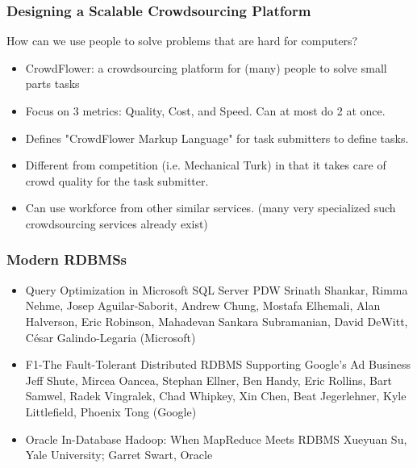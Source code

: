 \begin{frame} [plain]%
\frametitle{Designing a Scalable Crowdsourcing Platform}
	
How can we use people to solve problems that are hard for computers?

\begin{itemize}
\item CrowdFlower: a crowdsourcing platform for (many) people to solve small parts tasks 
\item Focus on 3 metrics: Quality, Cost, and Speed. Can at most do 2 at once.
\item Defines "CrowdFlower Markup Language" for task submitters to define tasks.
\item Different from competition (i.e. Mechanical Turk) in that it takes care of crowd quality for the task submitter.
\item Can use workforce from other similar services. (many very specialized such crowdsourcing services already exist)
\end{itemize}

\end{frame}




\begin{frame} %
\frametitle{Modern RDBMSs} 
\begin{itemize}
\item Query Optimization in Microsoft SQL Server PDW	
\ritem Srinath Shankar,  Rimma Nehme,  Josep Aguilar-Saborit,  Andrew Chung,  Mostafa Elhemali,  Alan Halverson,  Eric Robinson,  Mahadevan Sankara Subramanian,  David DeWitt,  César Galindo-Legaria (Microsoft)

\item F1-The Fault-Tolerant Distributed RDBMS Supporting Google's Ad Business	
\ritem Jeff Shute, Mircea Oancea, Stephan Ellner, Ben Handy, Eric Rollins, Bart Samwel, Radek Vingralek, Chad Whipkey, Xin Chen, Beat Jegerlehner, Kyle Littlefield, Phoenix Tong (Google)

\item Oracle In-Database Hadoop: When MapReduce Meets RDBMS	
\ritem Xueyuan Su, Yale University; Garret Swart, Oracle 
\end{itemize}
\end{frame}



